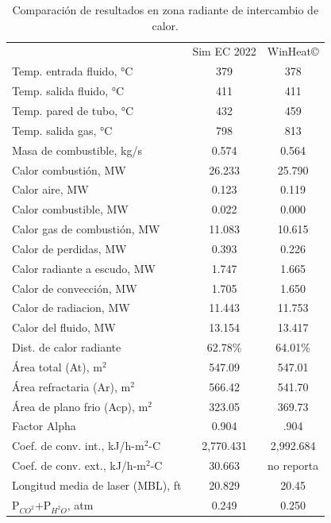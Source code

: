 \begin{table}
\begin{center}
\caption[Resultados en zona radiante de intercambio de calor]{Comparación de resultados en zona radiante de intercambio de calor.}
\label{tbl:compara-zr}
\begin{tabular}{l|c|c}
	& Sim EC 2022 & WinHeat\copyright \\
Temp. entrada fluido, °C		& 379 & 378	\\
Temp. salida fluido, °C			& 411 & 411	\\
Temp. pared de tubo, °C			& 432 & 459	\\
Temp. salida gas, °C			& 798 & 813	\\

Masa de combustible, kg/s		& 0.574 & 0.564	\\
Calor combustión, MW			& 26.233 & 25.790	\\
Calor aire, MW					& 0.123 & 0.119	\\
Calor combustible, MW			& 0.022 & 0.000	\\

Calor gas de combustión, MW		& 11.083 & 10.615	\\
Calor de perdidas, MW			& 0.393 & 0.226	\\
Calor radiante a escudo, MW		& 1.747 & 1.665	\\
Calor de convección, MW			& 1.705 & 1.650	\\
Calor de radiacion, MW			& 11.443 & 11.753	\\
Calor del fluido, MW			& 13.154 & 13.417	\\

Dist. de calor radiante			& 62.78\% & 64.01\% \\

Área total (At), m$^2$				& 547.09 & 547.01 \\
Área refractaria (Ar), m$^2$		& 566.42 & 541.70 \\
Área de plano frio (Acp), m$^2$		& 323.05 & 369.73 \\
Factor Alpha						& 0.904 & .904 \\

Coef. de conv. int., kJ/h-m$^2$-C	& 2,770.431 & 2,992.684 \\
Coef. de conv. ext., kJ/h-m$^2$-C	& 30.663 & no reporta \\

Longitud media de laser (MBL), ft	& 20.829 & 20.45 \\
P$_{CO^2}$+P$_{H^2O}$, atm 		& 0.249 & 0.250 \\
\end{tabular}
\end{center}
\end{table}


